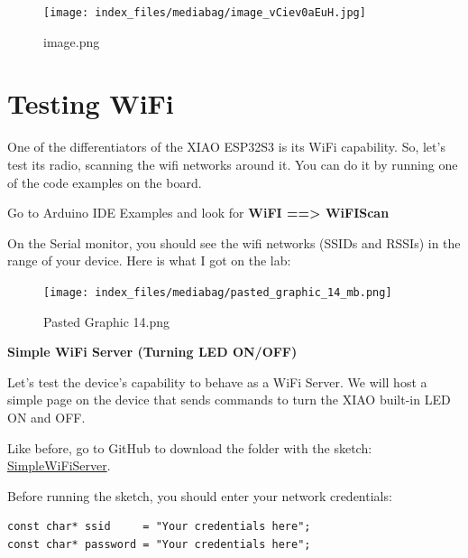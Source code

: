 \documentclass[
  letterpaper,
  DIV=11,
  numbers=noendperiod]{scrreprt}
\begin{document}
\begin{figure}[H]

{\centering \texttt{[image: index\_files/mediabag/image\_vCiev0aEuH.jpg]}

}

\caption{image.png}

\end{figure}

\hypertarget{testing-wifi}{%
\section*{Testing WiFi}\label{testing-wifi}}


One of the differentiators of the XIAO ESP32S3 is its WiFi capability.
So, let's test its radio, scanning the wifi networks around it. You can
do it by running one of the code examples on the board.

Go to Arduino IDE Examples and look for \textbf{WiFI ==\textgreater{}
WiFIScan}

On the Serial monitor, you should see the wifi networks (SSIDs and
RSSIs) in the range of your device. Here is what I got on the lab:

\begin{figure}[H]

{\centering \texttt{[image: index\_files/mediabag/pasted\_graphic\_14\_mb.png]}

}

\caption{Pasted Graphic 14.png}

\end{figure}

\textbf{Simple WiFi Server (Turning LED ON/OFF)}

Let's test the device's capability to behave as a WiFi Server. We will
host a simple page on the device that sends commands to turn the XIAO
built-in LED ON and OFF.

Like before, go to GitHub to download the folder with the sketch:
\href{https://github.com/Mjrovai/XIAO-ESP32S3-Sense/tree/main/SimpleWiFiServer}{SimpleWiFiServer}.

Before running the sketch, you should enter your network credentials:

\begin{verbatim}
const char* ssid     = "Your credentials here";
const char* password = "Your credentials here";
\end{verbatim}
\end{document}
